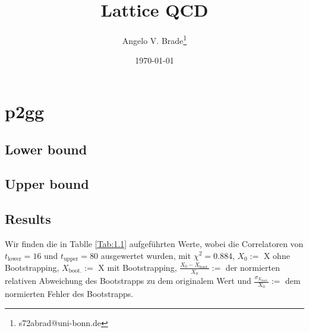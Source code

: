 \documentclass[10pt]{article}
\title{Lattice QCD}
\author[1]{Angelo V. Brade\thanks{s72abrad@uni-bonn.de}}
\affil[1]{Rheinische Friedrich-Wilhelms-Universität Bonn}
\date{\today}
\newenvironment{Figure}
  {\par\medskip\noindent\minipage{\linewidth}}
  {\endminipage\par\medskip}
\begin{document}
\maketitle
\newpage

\tableofcontents
\newpage


\pagestyle{fancy}
\fancyhead[R]{\thepage}
\fancyhead[L]{\leftmark}



\section{p2gg}
\subsection{Lower bound}
\begin{Figure}
  \centering\resizebox{\textwidth}{!}{}
  \label{fig:1.1}
\end{Figure}


\subsection{Upper bound}
\begin{Figure}
  \centering\resizebox{\textwidth}{!}{}
  \label{fig:1.2}

\subsection{Results}
\end{Figure}
\begin{Figure}
  \centering\resizebox{\textwidth}{!}{}
  \label{fig:1.3}
\end{Figure}

Wir finden die in Tablle \ref{Tab:1.1} aufgeführten Werte, wobei die Correlatoren von \(t_\text{lower}=16\) und \(t_\text{upper}=80\) ausgewertet wurden, mit \(\chi^2=0.884\), \(X_0:=\) X ohne Bootstrapping, \(X_\text{boot.}:=\) X mit Bootstrapping, \(\frac{X_0 - X_\text{boot.}}{X_0}:=\) der normierten relativen Abweichung des Bootstrapps zu dem originalem Wert und \(\frac{\sigma_{X_\text{boot.}}}{X_0}:=\) dem normierten Fehler des Bootstrapps.
\end{document}
